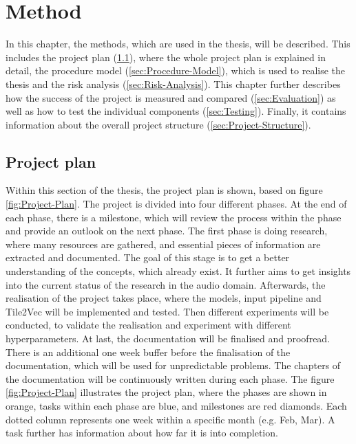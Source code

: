 \chapter{Method}
\label{ch:Method}
In this chapter, the methods, which are used in the thesis, will be described. This includes the project plan (\ref{sec:Project-Plan}), where the whole project plan is explained in detail, the procedure model (\ref{sec:Procedure-Model}), which is used to realise the thesis and the risk analysis (\ref{sec:Risk-Analysis}). This chapter further describes how the success of the project is measured and compared (\ref{sec:Evaluation}) as well as how to test the individual components (\ref{sec:Testing}). Finally, it contains information about the overall project structure (\ref{sec:Project-Structure}).

\section{Project plan}
\label{sec:Project-Plan}
Within this section of the thesis, the project plan is shown, based on figure \ref{fig:Project-Plan}. The project is divided into four different phases. At the end of each phase, there is a milestone, which will review the process within the phase and provide an outlook on the next phase. The first phase is doing research, where many resources are gathered, and essential pieces of information are extracted and documented. The goal of this stage is to get a better understanding of the concepts, which already exist. It further aims to get insights into the current status of the research in the audio domain. Afterwards, the realisation of the project takes place, where the models, input pipeline and Tile2Vec will be implemented and tested. Then different experiments will be conducted, to validate the realisation and experiment with different hyperparameters. At last, the documentation will be finalised and proofread. There is an additional one week buffer before the finalisation of the documentation, which will be used for unpredictable problems. The chapters of the documentation will be continuously written during each phase.
\newline
\newline
The figure \ref{fig:Project-Plan} illustrates the project plan, where the phases are shown in orange, tasks within each phase are blue, and milestones are red diamonds. Each dotted column represents one week within a specific month (e.g. Feb, Mar). A task further has information about how far it is into completion.

